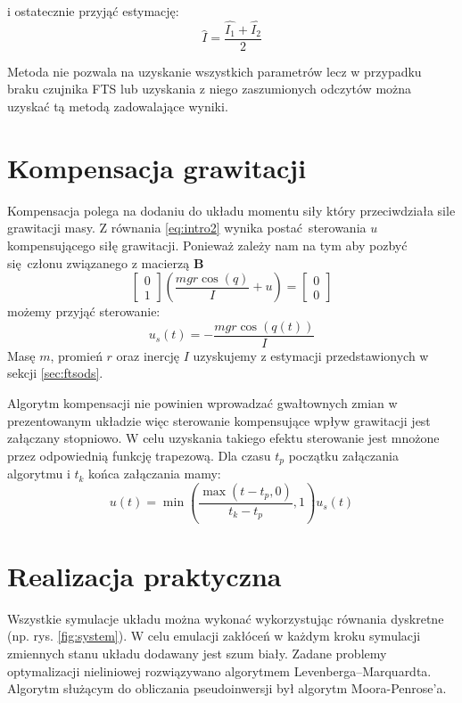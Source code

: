 \documentclass[a4paper, 10pt]{article}
\begin{document}
i ostatecznie przyjąć estymację:
\begin{equation}
\hat{I} = \frac{\hat{I_1}+\hat{I_2}}{2}
\end{equation}


Metoda nie pozwala na uzyskanie wszystkich parametrów lecz w przypadku braku czujnika FTS lub uzyskania z niego zaszumionych odczytów można uzyskać tą metodą zadowalające wyniki.

\section{Kompensacja grawitacji}
Kompensacja polega na dodaniu do układu momentu siły który przeciwdziała sile grawitacji masy. Z równania \ref{eq:intro2} wynika postać sterowania $u$ kompensującego siłę grawitacji. Ponieważ zależy nam na tym aby pozbyć się członu związanego z macierzą $\mathbf{B}$
\begin{equation}
	\begin{bmatrix}
	0 \\
	1
	\end{bmatrix}
	(\frac{mgr\cos{(q)}}{I} + u) = 	\begin{bmatrix}
	0 \\
	0
	\end{bmatrix}
\end{equation}
możemy przyjąć sterowanie:
\begin{equation}
u_s(t) = -\frac{mgr\cos{(q(t))}}{I}
\end{equation}
Masę $m$, promień $r$ oraz inercję $I$ uzyskujemy z estymacji przedstawionych w sekcji \ref{sec:ftsods}.


Algorytm kompensacji nie powinien wprowadzać gwałtownych zmian w prezentowanym układzie więc sterowanie kompensujące wpływ grawitacji jest załączany stopniowo. W celu uzyskania takiego efektu sterowanie jest mnożone przez odpowiednią funkcję trapezową. Dla czasu $t_p$ początku załączania algorytmu i $t_k$ końca załączania mamy:
\begin{equation}
u(t) = \min{(\frac{\max{( t - t_p, 0)}}{t_k-t_p}, 1)}u_s(t)
\end{equation}


\section{Realizacja praktyczna}
Wszystkie symulacje układu można wykonać wykorzystując równania dyskretne (np. rys. \ref{fig:system}). W celu emulacji zakłóceń w każdym kroku symulacji zmiennych stanu układu dodawany jest szum biały. Zadane problemy optymalizacji nieliniowej rozwiązywano algorytmem Levenberga–Marquardta. Algorytm służącym do obliczania pseudoinwersji był algorytm Moora-Penrose'a. 
\end{document}
